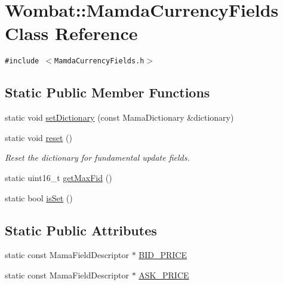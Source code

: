 \hypertarget{classWombat_1_1MamdaCurrencyFields}{
\section{Wombat::Mamda\-Currency\-Fields Class Reference}
\label{classWombat_1_1MamdaCurrencyFields}
}
{\tt \#include $<$Mamda\-Currency\-Fields.h$>$}

\subsection*{Static Public Member Functions}
\begin{CompactItemize}
\item 
static void \hyperlink{classWombat_1_1MamdaCurrencyFields_b8f7dae141b38d0f2fb8559cbdc5d2ac}{set\-Dictionary} (const Mama\-Dictionary \&dictionary)
\item 
static void \hyperlink{classWombat_1_1MamdaCurrencyFields_ef59780f0045349e99e8a8edf2f2806c}{reset} ()
\begin{CompactList}\small\item\em Reset the dictionary for fundamental update fields. \item\end{CompactList}\item 
static uint16\_\-t \hyperlink{classWombat_1_1MamdaCurrencyFields_777ea2ca34e62297186846eaf8b53da2}{get\-Max\-Fid} ()
\item 
static bool \hyperlink{classWombat_1_1MamdaCurrencyFields_eba78583c0f73b030652ec0aa450d7f4}{is\-Set} ()
\end{CompactItemize}
\subsection*{Static Public Attributes}
\begin{CompactItemize}
\item 
static const Mama\-Field\-Descriptor $\ast$ \hyperlink{classWombat_1_1MamdaCurrencyFields_324029c861a3ca277fd858fad9b97905}{BID\_\-PRICE}
\item 
static const Mama\-Field\-Descriptor $\ast$ \hyperlink{classWombat_1_1MamdaCurrencyFields_7945ee0d8d4fb868b6d891122d535599}{ASK\_\-PRICE}
\end{CompactItemize}


